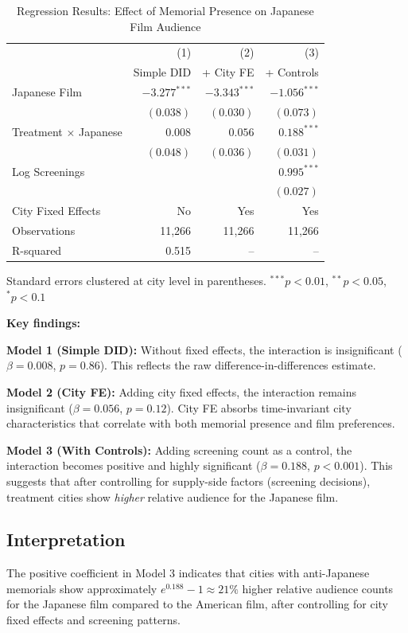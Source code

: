 \documentclass[12pt]{article}
\begin{document}
\begin{table}[H]
\centering
\caption{Regression Results: Effect of Memorial Presence on Japanese Film Audience}
\label{tab:results}
\begin{tabular}{lrrr}
\toprule
 & (1) & (2) & (3) \\
 & Simple DID & + City FE & + Controls \\
\midrule
Japanese Film & $-3.277^{***}$ & $-3.343^{***}$ & $-1.056^{***}$ \\
 & $(0.038)$ & $(0.030)$ & $(0.073)$ \\
Treatment $\times$ Japanese & $0.008$ & $0.056$ & $0.188^{***}$ \\
 & $(0.048)$ & $(0.036)$ & $(0.031)$ \\
Log Screenings & & & $0.995^{***}$ \\
 & & & $(0.027)$ \\
City Fixed Effects & No & Yes & Yes \\
Observations & 11,266 & 11,266 & 11,266 \\
R-squared & 0.515 & -- & -- \\
\bottomrule
\end{tabular}
\small{Standard errors clustered at city level in parentheses. $^{***}p<0.01$, $^{**}p<0.05$, $^{*}p<0.1$}
\end{table}

\textbf{Key findings:}

\textbf{Model 1 (Simple DID):} Without fixed effects, the interaction is insignificant ($\beta = 0.008$, $p = 0.86$). This reflects the raw difference-in-differences estimate.

\textbf{Model 2 (City FE):} Adding city fixed effects, the interaction remains insignificant ($\beta = 0.056$, $p = 0.12$). City FE absorbs time-invariant city characteristics that correlate with both memorial presence and film preferences.

\textbf{Model 3 (With Controls):} Adding screening count as a control, the interaction becomes positive and highly significant ($\beta = 0.188$, $p < 0.001$). This suggests that after controlling for supply-side factors (screening decisions), treatment cities show \textit{higher} relative audience for the Japanese film.

\subsection{Interpretation}

The positive coefficient in Model 3 indicates that cities with anti-Japanese memorials show approximately $e^{0.188} - 1 \approx 21\%$ higher relative audience counts for the Japanese film compared to the American film, after controlling for city fixed effects and screening patterns.
\end{document}
